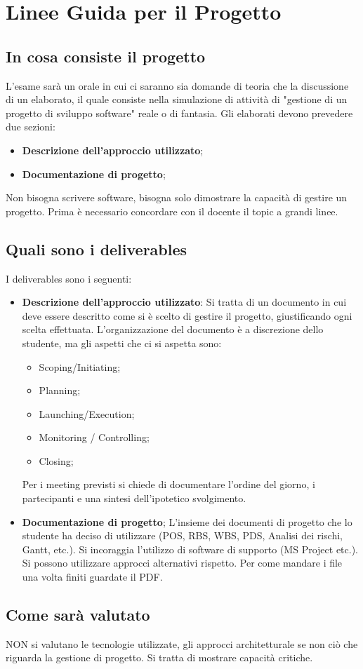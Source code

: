 \section{Linee Guida per il Progetto}
\subsection{In cosa consiste il progetto}
L'esame sarà un orale in cui ci saranno sia domande di teoria che la discussione di un elaborato, il quale consiste nella simulazione di attività di "gestione di un progetto di sviluppo software" reale o di fantasia.\newline
Gli elaborati devono prevedere due sezioni:
\begin{itemize}
	\item \textbf{Descrizione dell'approccio utilizzato};
	\item \textbf{Documentazione di progetto};
\end{itemize}
Non bisogna scrivere software, bisogna solo dimostrare la capacità di gestire un progetto. Prima è necessario concordare con il docente il topic a grandi linee.
\subsection{Quali sono i deliverables}
I deliverables sono i seguenti:
\begin{itemize}
	\item \textbf{Descrizione dell'approccio utilizzato}: Si tratta di un documento in cui deve essere descritto come si è scelto di gestire il progetto, giustificando ogni scelta effettuata. L'organizzazione del documento è a discrezione dello studente, ma gli aspetti che ci si aspetta sono:
	\begin{itemize}
		\item Scoping/Initiating;
		\item Planning;
		\item Launching/Execution;
		\item Monitoring / Controlling;
		\item Closing;
	\end{itemize}
	Per i meeting previsti si chiede di documentare l'ordine del giorno, i partecipanti e una sintesi dell'ipotetico svolgimento.
	\item \textbf{Documentazione di progetto}; L'insieme dei documenti di progetto che lo studente ha deciso di utilizzare (POS, RBS, WBS, PDS, Analisi dei rischi, Gantt, etc.).\newline
	Si incoraggia l'utilizzo di software di supporto (MS Project etc.). Si possono utilizzare approcci alternativi rispetto. Per come mandare i file una volta finiti guardate il PDF.
\end{itemize}
\subsection{Come sarà valutato}
NON si valutano le tecnologie utilizzate, gli approcci architetturale se non ciò che riguarda la gestione di progetto. Si tratta di mostrare capacità critiche.
